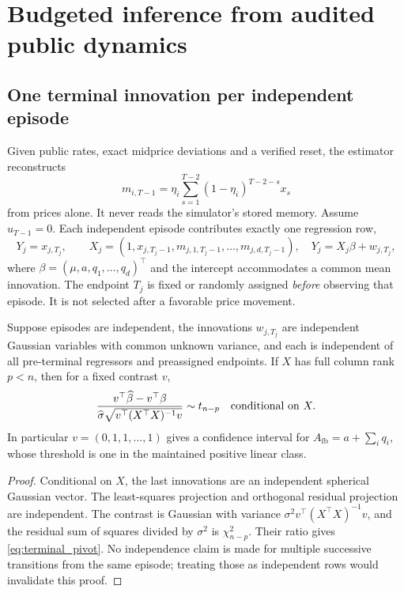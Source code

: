 \section{Budgeted inference from audited public dynamics}
\label{sec:budgeted_audit}
\subsection{One terminal innovation per independent episode}
Given public rates, exact midprice deviations and a verified reset, the estimator reconstructs
\begin{equation}
 m_{i,T-1}=\eta_i\sum_{s=1}^{T-2}(1-\eta_i)^{T-2-s}x_s
 \label{eq:observable_memory}
\end{equation}
from prices alone. It never reads the simulator's stored memory. Assume $u_{T-1}=0$. Each independent episode contributes exactly one regression row,
\begin{equation}
 Y_j=x_{j,T_j},\qquad
 X_j=(1,x_{j,T_j-1},m_{j,1,T_j-1},\ldots,m_{j,d,T_j-1}),
 \quad Y_j=X_j\beta+w_{j,T_j},
 \label{eq:terminal_regression}
\end{equation}
where $\beta=(\mu,a,q_1,\ldots,q_d)^\top$ and the intercept accommodates a common mean innovation. The endpoint $T_j$ is fixed or randomly assigned \emph{before} observing that episode. It is not selected after a favorable price movement.

\begin{proposition}
\label{prop:terminal_confidence}
Suppose episodes are independent, the innovations $w_{j,T_j}$ are independent Gaussian variables with common unknown variance, and each is independent of all pre-terminal regressors and preassigned endpoints. If $X$ has full column rank $p<n$, then for a fixed contrast $v$,
\begin{equation}
 \frac{v^\top\widehat\beta-v^\top\beta}
 {\widehat\sigma\sqrt{v^\top(X^\top X)^{-1}v}}
 \sim t_{n-p}\quad\hbox{conditional on }X.
 \label{eq:terminal_pivot}
\end{equation}
In particular $v=(0,1,1,\ldots,1)$ gives a confidence interval for
$A_{\mathrm{fb}}=a+\sum_iq_i$, whose threshold is one in the maintained positive linear class.
\end{proposition}
\begin{proof}
Conditional on $X$, the last innovations are an independent spherical Gaussian vector. The least-squares projection and orthogonal residual projection are independent. The contrast is Gaussian with variance $\sigma^2v^\top(X^\top X)^{-1}v$, and the residual sum of squares divided by $\sigma^2$ is $\chi^2_{n-p}$. Their ratio gives \cref{eq:terminal_pivot}. No independence claim is made for multiple successive transitions from the same episode; treating those as independent rows would invalidate this proof.
\end{proof}

